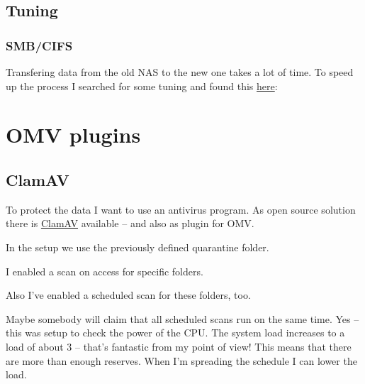 \subsection{Tuning}

\subsubsection{SMB/CIFS}

Transfering data from the old \gls{NAS} to the new one takes a lot of time. To
speed up the process I searched for some tuning and found this
\href{https://techie-show.com/open-media-vault-smb-performance-quick-win/}{here}:


\section{OMV plugins}

\subsection{ClamAV}\label{subsec:ClamAV}

To protect the data I want to use an antivirus program. As open source solution
there is \href{https://www.clamav.net}{ClamAV} available -- and also as plugin
for \gls{OMV}.


In the setup we use the previously defined quarantine folder.


I enabled a scan on access for specific folders.


Also I've enabled a scheduled scan for these folders, too.


Maybe somebody will claim that all scheduled scans run on the same time.\linebreak
Yes -- this was setup to check the power of the CPU. The system load increases
to a load of about 3 -- that's fantastic from my point of view! This means that
there are more than enough reserves. When I'm spreading the schedule I can
lower the load.

